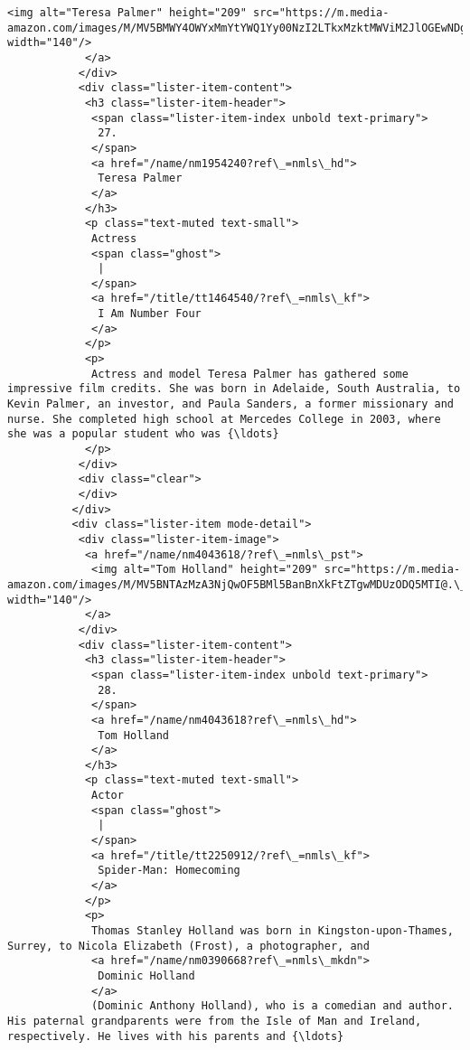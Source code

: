 \documentclass[11pt]{article}
\begin{document}
\begin{Verbatim}[commandchars=\\\{\}]
             <img alt="Teresa Palmer" height="209" src="https://m.media-amazon.com/images/M/MV5BMWY4OWYxMmYtYWQ1Yy00NzI2LTkxMzktMWViM2JlOGEwNDgwXkEyXkFqcGdeQXVyNDE1NzY2MTI@.\_V1\_UY209\_CR20,0,140,209\_AL\_.jpg" width="140"/>
            </a>
           </div>
           <div class="lister-item-content">
            <h3 class="lister-item-header">
             <span class="lister-item-index unbold text-primary">
              27.
             </span>
             <a href="/name/nm1954240?ref\_=nmls\_hd">
              Teresa Palmer
             </a>
            </h3>
            <p class="text-muted text-small">
             Actress
             <span class="ghost">
              |
             </span>
             <a href="/title/tt1464540/?ref\_=nmls\_kf">
              I Am Number Four
             </a>
            </p>
            <p>
             Actress and model Teresa Palmer has gathered some impressive film credits. She was born in Adelaide, South Australia, to Kevin Palmer, an investor, and Paula Sanders, a former missionary and nurse. She completed high school at Mercedes College in 2003, where she was a popular student who was {\ldots}
            </p>
           </div>
           <div class="clear">
           </div>
          </div>
          <div class="lister-item mode-detail">
           <div class="lister-item-image">
            <a href="/name/nm4043618/?ref\_=nmls\_pst">
             <img alt="Tom Holland" height="209" src="https://m.media-amazon.com/images/M/MV5BNTAzMzA3NjQwOF5BMl5BanBnXkFtZTgwMDUzODQ5MTI@.\_V1\_UY209\_CR16,0,140,209\_AL\_.jpg" width="140"/>
            </a>
           </div>
           <div class="lister-item-content">
            <h3 class="lister-item-header">
             <span class="lister-item-index unbold text-primary">
              28.
             </span>
             <a href="/name/nm4043618?ref\_=nmls\_hd">
              Tom Holland
             </a>
            </h3>
            <p class="text-muted text-small">
             Actor
             <span class="ghost">
              |
             </span>
             <a href="/title/tt2250912/?ref\_=nmls\_kf">
              Spider-Man: Homecoming
             </a>
            </p>
            <p>
             Thomas Stanley Holland was born in Kingston-upon-Thames, Surrey, to Nicola Elizabeth (Frost), a photographer, and
             <a href="/name/nm0390668?ref\_=nmls\_mkdn">
              Dominic Holland
             </a>
             (Dominic Anthony Holland), who is a comedian and author. His paternal grandparents were from the Isle of Man and Ireland, respectively. He lives with his parents and {\ldots}

\end{Verbatim}
\end{document}
